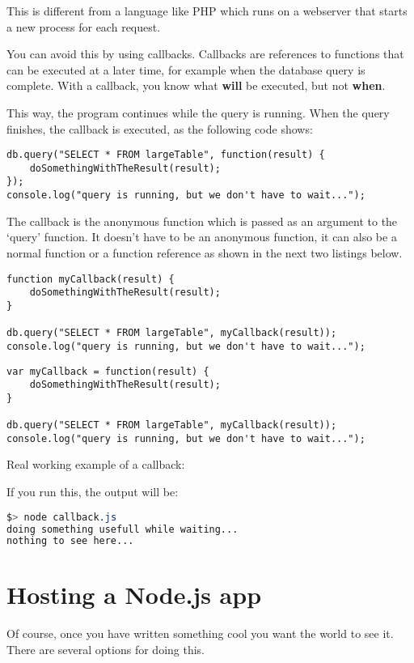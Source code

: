 \documentclass[a4paper]{report}
\begin{document}
This is different from a language like PHP which runs on a webserver that starts a new process for each request.

You can avoid this by using callbacks. Callbacks are references to functions that can be executed at a later time, for example when the database query is complete. With a callback, you know what \textbf{will} be executed, but not \textbf{when}.

This way, the program continues while the query is running. When the query finishes, the callback is executed, as the following code shows:

\begin{lstlisting}
db.query("SELECT * FROM largeTable", function(result) {
	doSomethingWithTheResult(result);
});
console.log("query is running, but we don't have to wait...");
\end{lstlisting}

\noindent The callback is the anonymous function which is passed as an argument to the `query' function. It doesn't have to be an anonymous function, it can also be a normal function or a function reference as shown in the next two listings below.

\begin{lstlisting}
function myCallback(result) {
	doSomethingWithTheResult(result);
}

db.query("SELECT * FROM largeTable", myCallback(result));
console.log("query is running, but we don't have to wait...");
\end{lstlisting}

\begin{lstlisting}
var myCallback = function(result) {
	doSomethingWithTheResult(result);
}

db.query("SELECT * FROM largeTable", myCallback(result));
console.log("query is running, but we don't have to wait...");
\end{lstlisting}

\noindent Real working example of a callback:

If you run this, the output will be:
\begin{lstlisting}[language=css]
$> node callback.js 
doing something usefull while waiting...
nothing to see here...
\end{lstlisting}

\section*{Hosting a Node.js app}
Of course, once you have written something cool you want the world to see it. There are several options for doing this.
\end{document}
